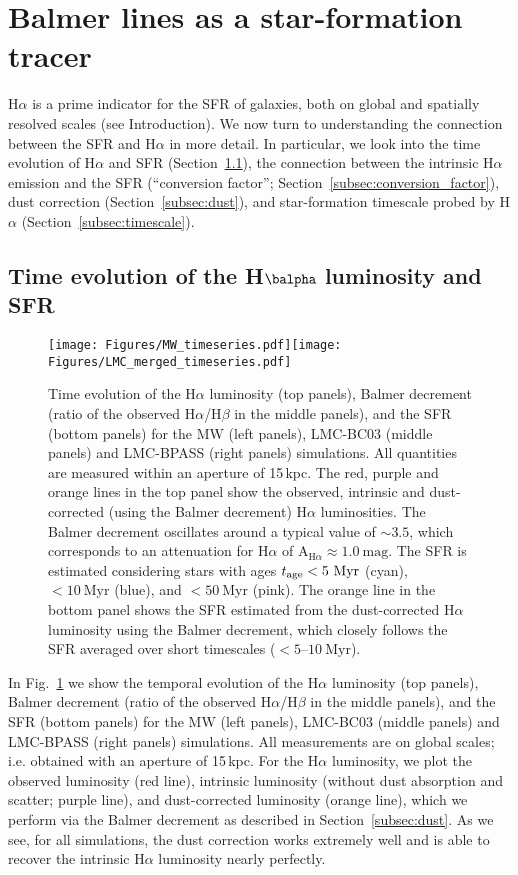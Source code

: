 \documentclass[fleqn,usenatbib]{mnras}
\begin{document}
\section{Balmer lines as a star-formation tracer}
\label{sec:sfr}

H$\alpha$ is a prime indicator for the SFR of galaxies, both on global and spatially resolved scales (see Introduction). We now turn to understanding the connection between the SFR and H$\alpha$ in more detail. In particular, we look into the time evolution of H$\alpha$ and SFR (Section~\ref{subsec:time_evolution}), the connection between the intrinsic H$\alpha$ emission and the SFR (``conversion factor''; Section~\ref{subsec:conversion_factor}), dust correction (Section~\ref{subsec:dust}), and star-formation timescale probed by H$\alpha$ (Section~\ref{subsec:timescale}).


\subsection{Time evolution of the H\texorpdfstring{$\balpha$}{α} luminosity and SFR}
\label{subsec:time_evolution}

\begin{figure*}
\texttt{[image: Figures/MW\_timeseries.pdf]}\!\!\texttt{[image: Figures/LMC\_merged\_timeseries.pdf]}
\caption{Time evolution of the H$\alpha$ luminosity (top panels), Balmer decrement (ratio of the observed H$\alpha$/H$\beta$ in the middle panels), and the SFR (bottom panels) for the MW (left panels), LMC-BC03 (middle panels) and LMC-BPASS (right panels) simulations. All quantities are measured within an aperture of 15\,kpc. The red, purple and orange lines in the top panel show the observed, intrinsic and dust-corrected (using the Balmer decrement) H$\alpha$ luminosities. The Balmer decrement oscillates around a typical value of $\sim3.5$, which corresponds to an attenuation for H$\alpha$ of $\mathrm{A}_{\mathrm{H}\alpha}\approx1.0~\mathrm{mag}$. The SFR is estimated considering stars with ages $t_{\rm age}<5~\mathrm{Myr}$ (cyan), $<10~\mathrm{Myr}$ (blue), and $<50~\mathrm{Myr}$ (pink). The orange line in the bottom panel shows the SFR estimated from the dust-corrected H$\alpha$ luminosity using the Balmer decrement, which closely follows the SFR averaged over short timescales ($<5$--$10~\mathrm{Myr}$).}
\label{fig:timeseries}
\end{figure*}

In Fig.~\ref{fig:timeseries} we show the temporal evolution of the H$\alpha$ luminosity (top panels), Balmer decrement (ratio of the observed H$\alpha$/H$\beta$ in the middle panels), and the SFR (bottom panels) for the MW (left panels), LMC-BC03 (middle panels) and LMC-BPASS (right panels) simulations. All measurements are on global scales; i.e. obtained with an aperture of 15\,kpc. For the H$\alpha$ luminosity, we plot the observed luminosity (red line), intrinsic luminosity (without dust absorption and scatter; purple line), and dust-corrected luminosity (orange line), which we perform via the Balmer decrement as described in Section~\ref{subsec:dust}. As we see, for all simulations, the dust correction works extremely well and is able to recover the intrinsic H$\alpha$ luminosity nearly perfectly.
\end{document}
